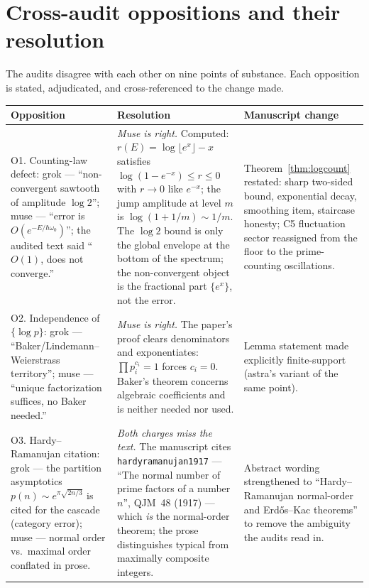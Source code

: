 \documentclass[11pt,a4paper]{article}
\begin{document}
\section{Cross-audit oppositions and their resolution}

The audits disagree with each other on nine points of substance. Each
opposition is stated, adjudicated, and cross-referenced to the change made.

\begin{longtable}{@{}p{}p{}p{}@{}}
\toprule
\textbf{Opposition} & \textbf{Resolution} & \textbf{Manuscript change}\\
\midrule
\endhead
O1. Counting-law defect: grok --- ``non-convergent sawtooth of amplitude
$\log 2$''; muse --- ``error is $O(e^{-E/\hbar\omega_{0}})$''; the audited text
said ``$O(1)$, does not converge.'' &
\emph{Muse is right.} Computed: $r(E)=\log\lfloor e^{x}\rfloor-x$ satisfies
$\log(1-e^{-x})\le r\le 0$ with $r\to0$ like $e^{-x}$; the jump amplitude at
level $m$ is $\log(1+1/m)\sim 1/m$. The $\log 2$ bound is only the global
envelope at the bottom of the spectrum; the non-convergent object is the
fractional part $\{e^{x}\}$, not the error. &
Theorem~\ref{thm:logcount} restated: sharp two-sided bound, exponential decay,
smoothing item, staircase honesty; C5 fluctuation sector reassigned from the
floor to the prime-counting oscillations.\\
O2. Independence of $\{\log p\}$: grok --- ``Baker/Lindemann--Weierstrass
territory''; muse --- ``unique factorization suffices, no Baker needed.'' &
\emph{Muse is right.} The paper's proof clears denominators and exponentiates:
$\prod p_i^{c_i}=1$ forces $c_i=0$. Baker's theorem concerns algebraic
coefficients and is neither needed nor used. &
Lemma statement made explicitly finite-support (astra's variant of the same
point).\\
O3. Hardy--Ramanujan citation: grok --- the partition asymptotics
$p(n)\sim e^{\pi\sqrt{2n/3}}$ is cited for the cascade (category error); muse
--- normal order vs.\ maximal order conflated in prose. &
\emph{Both charges miss the text.} The manuscript cites
\texttt{hardyramanujan1917} --- ``The normal number of prime factors of a
number $n$'', QJM~48 (1917) --- which \emph{is} the normal-order theorem; the
prose distinguishes typical from maximally composite integers. &
Abstract wording strengthened to ``Hardy--Ramanujan normal-order and
Erd\H{o}s--Kac theorems'' to remove the ambiguity the audits read in.\\

\end{longtable}
\end{document}
